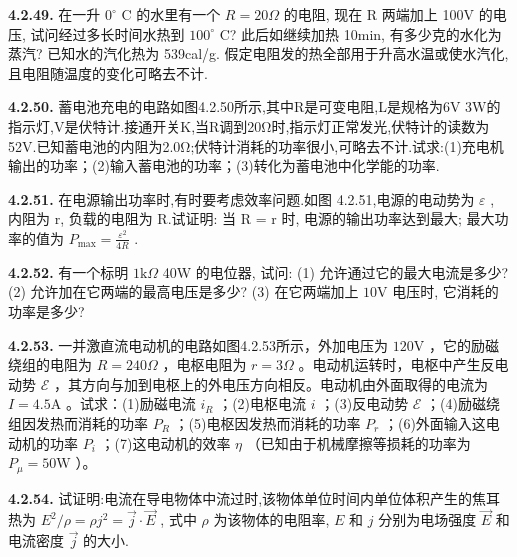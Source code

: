 \vfill
\newpage

\textbf{4.2.49.} 在一升 $0^{\circ}$ C 的水里有一个 $R = 20\Omega$ 的电阻, 现在 R 两端加上 100V 的电压, 试问经过多长时间水热到 $100^{\circ}$ C? 此后如继续加热 10min, 有多少克的水化为蒸汽? 已知水的汽化热为 539cal/g. 假定电阻发的热全部用于升高水温或使水汽化, 且电阻随温度的变化可略去不计.

\vfill
\newpage

\textbf{4.2.50.} 蓄电池充电的电路如图4.2.50所示,其中R是可变电阻,L是规格为6V 3W的指示灯,V是伏特计.接通开关K,当R调到20Ω时,指示灯正常发光,伏特计的读数为52V.已知蓄电池的内阻为2.0Ω;伏特计消耗的功率很小,可略去不计.试求:(1)充电机输出的功率；(2)输入蓄电池的功率；(3)转化为蓄电池中化学能的功率.

\begin{center}
\end{center}

\vfill
\newpage

\textbf{4.2.51.} 在电源输出功率时,有时要考虑效率问题.如图 4.2.51,电源的电动势为 $\varepsilon$ , 内阻为 r, 负载的电阻为 R.试证明: 当 R = r 时, 电源的输出功率达到最大; 最大功率的值为 $\displaystyle P_{\max} = \frac{\varepsilon^{2}}{4R}$ .

\vfill
\newpage

\textbf{4.2.52.} 有一个标明 $1\mathrm{k}\Omega$ 40W 的电位器, 试问: (1) 允许通过它的最大电流是多少? (2) 允许加在它两端的最高电压是多少? (3) 在它两端加上 $10\mathrm{V}$ 电压时, 它消耗的功率是多少?

\vfill
\newpage

\textbf{4.2.53.} 一并激直流电动机的电路如图4.2.53所示，外加电压为 $120\mathrm{V}$ ，它的励磁绕组的电阻为 $R = 240\Omega$ ，电枢电阻为 $r = 3\Omega$ 。电动机运转时，电枢中产生反电动势 $\mathcal{E}$ ，其方向与加到电枢上的外电压方向相反。电动机由外面取得的电流为 $I = 4.5\mathrm{A}$ 。试求：(1)励磁电流 $i_R$ ；(2)电枢电流 $i$ ；(3)反电动势 $\mathcal{E}$ ；(4)励磁绕组因发热而消耗的功率 $P_R$ ；(5)电枢因发热而消耗的功率 $P_r$ ；(6)外面输入这电动机的功率 $P_i$ ；(7)这电动机的效率 $\eta$ （已知由于机械摩擦等损耗的功率为 $P_\mu = 50\mathrm{W}$ ）。

\vfill
\newpage

\textbf{4.2.54.} 试证明:电流在导电物体中流过时,该物体单位时间内单位体积产生的焦耳热为 $E^{2}/\rho = \rho j^{2} = \vec{j} \cdot \vec{E}$ , 式中 $\rho$ 为该物体的电阻率, $E$ 和 $j$ 分别为电场强度 $\vec{E}$ 和电流密度 $\vec{j}$ 的大小.

\vfill
\newpage

